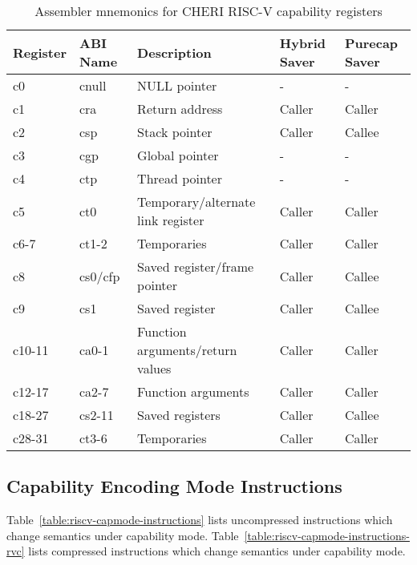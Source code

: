 {\begin{table}[h]
\begin{center}
\begin{tabular}{lllll}
\toprule
Register & ABI Name & Description						& Hybrid Saver & Purecap Saver \\
\midrule
c0	& cnull		& NULL pointer					& -		& - \\
c1	& cra		& Return address					& Caller	& Caller \\
c2	& csp		& Stack pointer					& Caller	& Callee \\
c3	& cgp		& Global pointer					& -		& - \\
c4	& ctp		& Thread pointer					& -		& - \\
c5	& ct0		& Temporary/alternate link register	& Caller	& Caller \\
c6-7 & ct1-2		& Temporaries						& Caller	& Caller \\
c8	& cs0/cfp	& Saved register/frame pointer		& Caller	& Callee \\
c9	& cs1		& Saved register					& Caller	& Callee \\
c10-11 & ca0-1	& Function arguments/return values	& Caller	& Caller \\
c12-17 & ca2-7	& Function arguments				& Caller	& Caller \\
c18-27 & cs2-11	& Saved registers					& Caller	& Callee \\
c28-31 & ct3-6	& Temporaries						& Caller	& Caller \\
\bottomrule
\end{tabular}
\end{center}
\caption{Assembler mnemonics for CHERI RISC-V capability registers}
\label{table:riscv-register-names}
\end{table}

	\subsection{Capability Encoding Mode Instructions}

	Table~\ref{table:riscv-capmode-instructions} lists uncompressed
	instructions which change semantics under capability mode.
	Table~\ref{table:riscv-capmode-instructions-rvc} lists compressed
	instructions which change semantics under capability mode.

}
